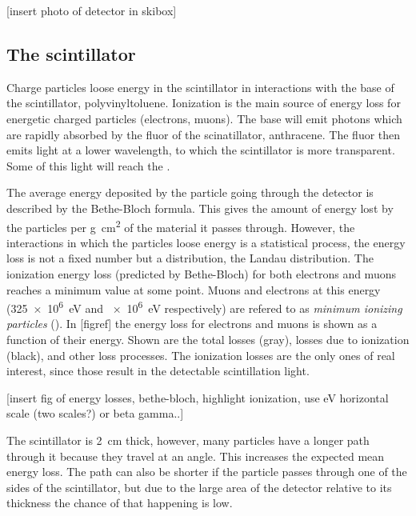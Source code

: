 [insert photo of detector in skibox]


\subsection{The scintillator}

Charge particles loose energy in the scintillator in interactions with the base of the scintillator, polyvinyltoluene. Ionization is the main source of energy loss for energetic charged particles (electrons, muons). The base will emit photons which are rapidly absorbed by the fluor of the scinatillator, anthracene. The fluor then emits light at a lower wavelength, to which the scintillator is more transparent. Some of this light will reach the \pmt.

The average energy deposited by the particle going through the detector is described by the Bethe-Bloch formula. This gives the amount of energy lost by the particles per \si{\gram\centi\meter\squared} of the material it passes through. However, the interactions in which the particles loose energy is a statistical process, the energy loss is not a fixed number but a distribution, the Landau distribution. The ionization energy loss (predicted by Bethe-Bloch) for both electrons and muons reaches a minimum value at some point. Muons and electrons at this energy (\SI{325e6}{\eV} and \SI{e6}{\eV} respectively) are refered to as \textit{minimum ionizing particles} (\mip). In [figref] the energy loss for electrons and muons is shown as a function of their energy. Shown are the total losses (gray), losses due to ionization (black), and other loss processes. The ionization losses are the only ones of real interest, since those result in the detectable scintillation light.

[insert fig of energy losses, bethe-bloch, highlight ionization, use eV horizontal scale (two scales?) or beta gamma..]

The scintillator is \SI{2}{\centi\meter} thick, however, many particles have a longer path through it because they travel at an angle. This increases the expected mean energy loss. The path can also be shorter if the particle passes through one of the sides of the scintillator, but due to the large area of the detector relative to its thickness the chance of that happening is low.

